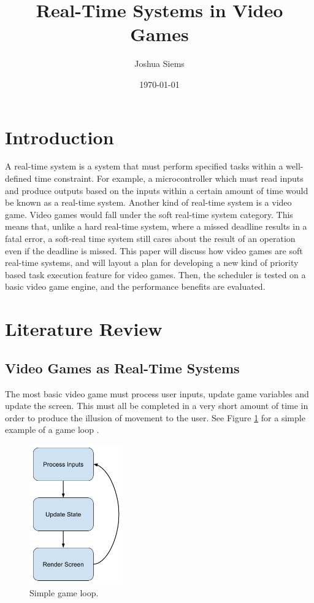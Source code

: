\documentclass[a4paper, 12pt]{article}
\title{Real-Time Systems in Video Games}
\author{Joshua Siems}
\date{\today}
\begin{document}

\maketitle


\section{Introduction}
    A real-time system is a system that must perform specified tasks within a well-defined time constraint. For example, a microcontroller which must read inputs and produce outputs based on the inputs within a certain amount of time would be known as a real-time system. Another kind of real-time system is a video game. Video games would fall under the soft real-time system category. This means that, unlike a hard real-time system, where a missed deadline results in a fatal error, a soft-real time system still cares about the result of an operation even if the deadline is missed. This paper will discuss how video games are soft real-time systems, and will layout a plan for developing a new kind of priority based task execution feature for video games. Then, the scheduler is tested on a basic video game engine, and the performance benefits are evaluated.

\section{Literature Review}

    \subsection{Video Games as Real-Time Systems}
         The most basic video game must process user inputs, update game variables and update the screen. This must all be completed in a very short amount of time in order to produce the illusion of movement to the user. See Figure \ref{update_cycle} for a simple example of a game loop \cite{sim_env}.
         \\

        \begin{figure}[H]
            \includegraphics[width=4cm]{game_loop_simple.png}
            \centering
            \caption{Simple game loop.}
            \label{update_cycle}
        \end{figure}
\end{document}
